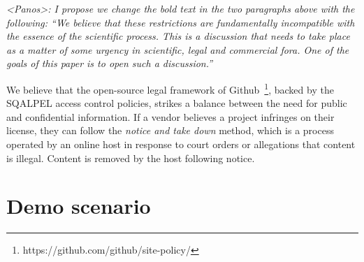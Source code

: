 \documentclass{cidr-2019}
\begin{document}
{\em <Panos>: I propose we change the bold text in the two paragraphs
  above with the following: ``We believe that these restrictions are
  fundamentally incompatible with the essence of the scientific
  process. This is a discussion that needs to take place as a matter
  of some urgency in scientific, legal and commercial fora. One of the
  goals of this paper is to open such a discussion.''}

We believe that the open-source legal framework of
Github~\footnote{https://github.com/github/site-policy/}, backed by
the {\sc SQALPEL} access control policies, strikes a balance between
the need for public and confidential information.  If a vendor
believes a project infringes on their license, they can follow the
\emph{notice and take down} method, which is a process operated by an
online host in response to court orders or allegations that content is
illegal. Content is removed by the host following notice.



\section{Demo scenario}\label{demo}

 
 
\end{document}
